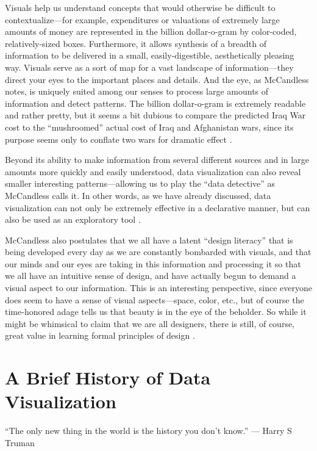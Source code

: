 \documentclass[]{book}
\theoremstyle{definition}
\theoremstyle{definition}
\theoremstyle{definition}
\theoremstyle{remark}
\begin{document}
Visuals help us understand concepts that would otherwise be difficult to
contextualize---for example, expenditures or valuations of extremely
large amounts of money are represented in the billion dollar-o-gram by
color-coded, relatively-sized boxes. Furthermore, it allows synthesis of
a breadth of information to be delivered in a small, easily-digestible,
aesthetically pleasing way. Visuals serve as a sort of map for a vast
landscape of information---they direct your eyes to the important places
and details. And the eye, as McCandless notes, is uniquely suited among
our senses to process large amounts of information and detect patterns.
The billion dollar-o-gram is extremely readable and rather pretty, but
it seems a bit dubious to compare the predicted Iraq War cost to the
``mushroomed'' actual cost of Iraq and Afghanistan wars, since its
purpose seems only to conflate two wars for dramatic effect
\citep{viz_ted}.

Beyond its ability to make information from several different sources
and in large amounts more quickly and easily understood, data
visualization can also reveal smaller interesting patterns---allowing us
to play the ``data detective'' as McCandless calls it. In other words,
as we have already discussed, data visualization can not only be
extremely effective in a declarative manner, but can also be used as an
exploratory tool \citep{viz_ted}.

McCandless also postulates that we all have a latent ``design literacy''
that is being developed every day as we are constantly bombarded with
visuals, and that our minds and our eyes are taking in this information
and processing it so that we all have an intuitive sense of design, and
have actually begun to demand a visual aspect to our information. This
is an interesting perspective, since everyone does seem to have a sense
of visual aspects---space, color, etc., but of course the time-honored
adage tells us that beauty is in the eye of the beholder. So while it
might be whimsical to claim that we are all designers, there is still,
of course, great value in learning formal principles of design
\citep{viz_ted}.

\section{A Brief History of Data
Visualization}\label{a-brief-history-of-data-visualization}

``The only new thing in the world is the history you don't know.'' ---
Harry S Truman
\end{document}
